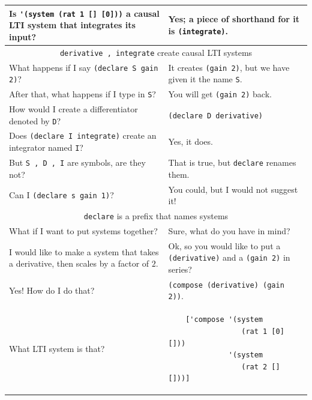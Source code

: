 \documentclass[11pt,letter]{article}
\begin{document}
\begin{longtable}{ p{} p{} }
  Is \lstinline!'(system (rat 1 [] [0]))! a causal LTI system that integrates its input?
  &
  Yes; a piece of shorthand for it is \lstinline!(integrate)!. \\

  \midrule

  \multicolumn{2}{c}{\Large\lstinline!derivative , integrate! create causal LTI systems} \\

  \midrule

  What happens if I say \lstinline!(declare S gain 2)!?
  &
  It creates \lstinline!(gain 2)!, but we have given it the name \lstinline!S!. \\

  After that, what happens if I type in \lstinline!S!?
  &
  You will get \lstinline!(gain 2)! back. \\

  How would I create a differentiator denoted by \lstinline!D!?
  &
  \lstinline!(declare D derivative)! \\

  Does \lstinline!(declare I integrate)! create an integrator named \lstinline!I!?
  &
  Yes, it does. \\

  But \lstinline!S , D , I! are symbols, are they not?
  &
  That is true, but \lstinline!declare! renames them. \\

  Can I \lstinline!(declare s gain 1)!?
  &
  You could, but I would not suggest it! \\

  \midrule

  \multicolumn{2}{c}{\Large\lstinline!declare! is a prefix that names systems} \\

  \midrule

  What if I want to put systems together?
  &
  Sure, what do you have in mind? \\

  I would like to make a system that takes a derivative, then scales by a factor of $2$.
  &
  Ok, so you would like to put a \lstinline!(derivative)! and a \lstinline!(gain 2)! in series? \\

  Yes! How do I do that?
  &
  \lstinline!(compose (derivative) (gain 2))!. \\

  What LTI system is that?
  &
  \begin{lstlisting}
    ['compose '(system
                 (rat 1 [0] []))
              '(system
                 (rat 2 [] []))]
  \end{lstlisting} \\


\end{longtable}
\end{document}
